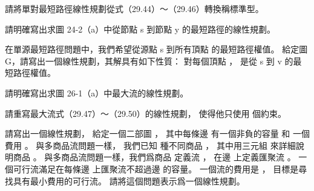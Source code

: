 \startsection[
  title={Formulating problems as linear programs},
]

\startEXERCISE
請將單對最短路徑線性規劃從式（29.44）～（29.46）轉換稱標準型。
\stopEXERCISE

\startANSWER
{}
\stopANSWER

\startEXERCISE
請明確寫出求圖 24-2（a）中從節點 s 到節點 y 的最短路徑的線性規劃。
\stopEXERCISE

\startANSWER
{}
\stopANSWER

\startEXERCISE
在單源最短路徑問題中，我們希望從源點 s 到所有頂點  的最短路徑權值。
給定圖 G，請寫出一個線性規劃，其解具有如下性質：
對每個頂點 ，  是從 s 到 v 的最短路徑權值。
\stopEXERCISE

\startANSWER
{}
\stopANSWER

\startEXERCISE
請明確寫出求圖 26-1（a）中最大流的線性規劃。
\stopEXERCISE

\startANSWER
{}
\stopANSWER

\startEXERCISE
請重寫最大流式（29.47）～（29.50）的線性規劃，
使得他只使用  個約束。
\stopEXERCISE

\startANSWER
{}
\stopANSWER

\startEXERCISE
請寫出一個線性規劃，
給定一個二部圖 ，
其中每條邊  有一個非負的容量  和
一個費用 。
與多商品流問題一樣，
我們已知  種不同商品 ，
其中用三元組  來詳細說明商品 。
與多商品流問題一樣，我們爲商品  定義流 ，
在邊  上定義匯聚流 。
一個可行流滿足在每條邊  上匯聚流不超過邊  的容量。
一個流的費用是 ，
目標是尋找具有最小費用的可行流。
請將這個問題表示爲一個線性規劃。
\stopEXERCISE

\startANSWER
{}
\stopANSWER

\stopsection
